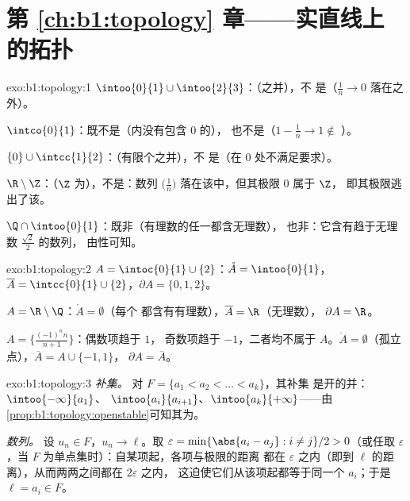 \section*{第 \ref{ch:b1:topology} 章——实直线上的拓扑}

\begin{solution}{exo:b1:topology:1}
$\intoo{0}{1} \cup \intoo{2}{3}$：（之并），不
是（$\frac 1n \to 0$ 落在之外）。

$\intco{0}{1}$：既不是（内没有包含 $0$ 的），
也不是（$1 - \frac1n \to 1 \notin$ ）。

$\{0\} \cup \intcc{1}{2}$：（有限个之并），不
是（在 $0$ 处不满足要求）。

$\R \setminus \Z$：（$\Z$ 为），不是：数列
$\bigl(\frac 1n\bigr)$ 落在该中，但其极限 $0$ 属于 $\Z$，
即其极限逃出了该。

$\Q \cap \intoo{0}{1}$：既非（有理数的任一都含无理数），
也非：它含有趋于无理数 $\frac{\sqrt 2}{2}$ 的数列，
由性可知。
\end{solution}

\begin{solution}{exo:b1:topology:2}
$A = \intoc{0}{1} \cup \{2\}$：$\mathring A = \intoo{0}{1}$，
$\overline A = \intcc{0}{1} \cup \{2\}$，$\partial A = \{0, 1, 2\}$。

$A = \R \setminus \Q$：$\mathring A = \emptyset$（每个
都含有有理数），$\overline A = \R$（无理数），
$\partial A = \R$。

$A = \bigl\{\frac{(-1)^n n}{n+1}\bigr\}$：偶数项趋于 $1$，
奇数项趋于 $-1$，二者均不属于 $A$。$\mathring A =
\emptyset$（孤立点），$\overline A = A \cup \{-1, 1\}$，
$\partial A = \overline A$。
\end{solution}

\begin{solution}{exo:b1:topology:3}
\emph{补集。} 对 $F = \{a_1 < a_2 < \dots < a_k\}$，其补集
是开的并：$\intoo{-\infty}{a_1}$、
$\intoo{a_i}{a_{i+1}}$、$\intoo{a_k}{+\infty}$——由
\cref{prop:b1:topology:openstable}可知其为。

\emph{数列。} 设 $u_n \in F$，$u_n \to \ell$。取 $\varepsilon
= \min\{\abs{a_i - a_j} : i \neq j\}/2 > 0$（或任取 $\varepsilon$，当
$F$ 为单点集时）：自某项起，各项与极限的距离
都在 $\varepsilon$ 之内（即到 $\ell$ 的距离），从而两两之间都在 $2\varepsilon$ 之内，
这迫使它们从该项起都等于同一个 $a_i$；于是
$\ell = a_i \in F$。
\end{solution}

